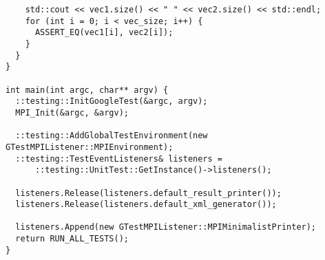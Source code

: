 \documentclass{report}
\begin{document}
\begin{lstlisting}
    std::cout << vec1.size() << " " << vec2.size() << std::endl;
    for (int i = 0; i < vec_size; i++) {
      ASSERT_EQ(vec1[i], vec2[i]);
    }
  }
}

int main(int argc, char** argv) {
  ::testing::InitGoogleTest(&argc, argv);
  MPI_Init(&argc, &argv);

  ::testing::AddGlobalTestEnvironment(new GTestMPIListener::MPIEnvironment);
  ::testing::TestEventListeners& listeners =
      ::testing::UnitTest::GetInstance()->listeners();

  listeners.Release(listeners.default_result_printer());
  listeners.Release(listeners.default_xml_generator());

  listeners.Append(new GTestMPIListener::MPIMinimalistPrinter);
  return RUN_ALL_TESTS();
}
\end{lstlisting}
\end{document}
